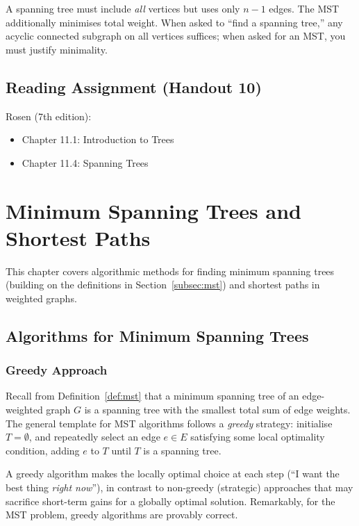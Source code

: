 \documentclass[11pt, a4paper, notitlepage]{report}
\theoremstyle{definition}
\theoremstyle{remark}
\begin{document}
\begin{examtip}[title={Exam Tip: MST vs.\ Spanning Tree}]
A spanning tree must include \emph{all} vertices but uses only $n-1$ edges. The MST additionally minimises total weight. When asked to ``find a spanning tree,'' any acyclic connected subgraph on all vertices suffices; when asked for an MST, you must justify minimality.
\end{examtip}

\section*{Reading Assignment (Handout 10)}

Rosen (7th edition):
\begin{itemize}
  \item Chapter 11.1: Introduction to Trees
  \item Chapter 11.4: Spanning Trees
\end{itemize}

\chapter{Minimum Spanning Trees and Shortest Paths}
\label{chap:mst-shortest}

This chapter covers algorithmic methods for finding minimum spanning trees (building on the definitions in Section~\ref{subsec:mst}) and shortest paths in weighted graphs.

\section{Algorithms for Minimum Spanning Trees}
\label{sec:mst-algorithms}

\subsection{Greedy Approach}
\label{subsec:greedy-mst}

Recall from Definition~\ref{def:mst} that a minimum spanning tree of an edge-weighted graph $G$ is a spanning tree with the smallest total sum of edge weights. The general template for MST algorithms follows a \emph{greedy} strategy: initialise $T = \emptyset$, and repeatedly select an edge $e \in E$ satisfying some local optimality condition, adding $e$ to $T$ until $T$ is a spanning tree.

A greedy algorithm makes the locally optimal choice at each step (``I want the best thing \emph{right now}''), in contrast to non-greedy (strategic) approaches that may sacrifice short-term gains for a globally optimal solution. Remarkably, for the MST problem, greedy algorithms are provably correct.
\end{document}
